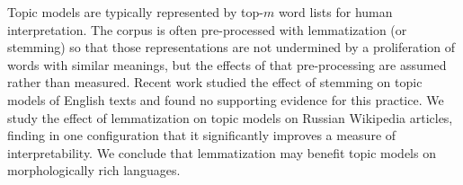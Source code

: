 Topic models are typically represented by top-$m$ word lists for human
interpretation.  The corpus is often pre-processed with lemmatization
(or stemming)
so that those representations are not undermined by a proliferation of
words with similar meanings, but the effects of that pre-processing are
assumed rather than measured.  Recent work studied the effect of
stemming on topic models of English texts
and found no supporting evidence for this practice.  We study the
effect of lemmatization on topic models on Russian Wikipedia articles,
finding in one configuration that it significantly improves a measure
of interpretability.  We conclude that lemmatization may benefit
topic models on morphologically rich languages.
